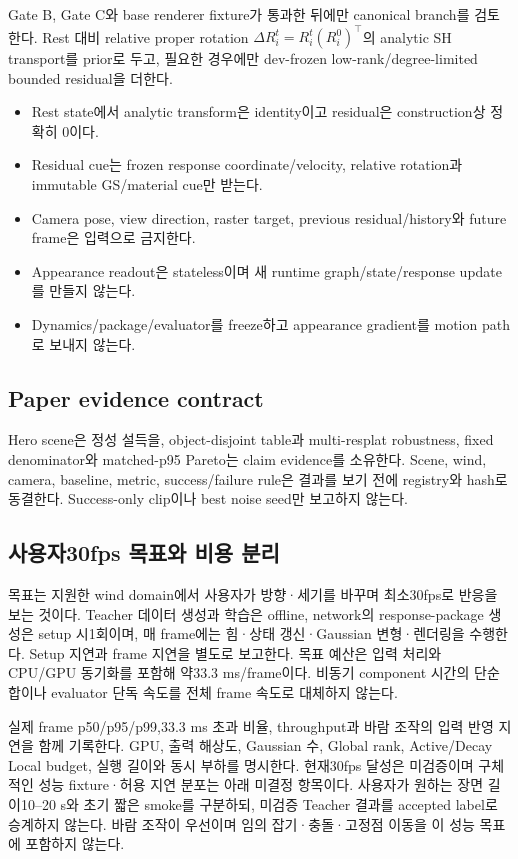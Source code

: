 \documentclass[10pt]{article}
\begin{document}
Gate B, Gate C와 base renderer fixture가 통과한 뒤에만 canonical
 branch를 검토한다. Rest 대비 relative proper rotation
\(\Delta R_i^t=R_i^t(R_i^0)^\top\)의 analytic SH transport를 prior로 두고, 필요한 경우에만
dev-frozen low-rank/degree-limited bounded residual을 더한다.

\begin{itemize}
  \item Rest state에서 analytic transform은 identity이고 residual은 construction상 정확히 0이다.
  \item Residual cue는 frozen response coordinate/velocity, relative rotation과 immutable GS/material cue만 받는다.
  \item Camera pose, view direction, raster target, previous residual/history와 future frame은 입력으로 금지한다.
  \item Appearance readout은 stateless이며 새 runtime graph/state/response update를 만들지 않는다.
  \item Dynamics/package/evaluator를 freeze하고 appearance gradient를 motion path로 보내지 않는다.
\end{itemize}

\subsection{Paper evidence contract}

Hero scene은 정성 설득을, object-disjoint table과 multi-resplat robustness, fixed denominator와 matched-p95
Pareto는 claim evidence를 소유한다. Scene, wind, camera, baseline, metric, success/failure rule은 결과를 보기 전에
registry와 hash로 동결한다. Success-only clip이나 best noise seed만 보고하지 않는다.

\subsection{사용자30fps 목표와 비용 분리}

목표는 지원한 wind domain에서 사용자가 방향·세기를 바꾸며 최소30fps로 반응을 보는 것이다.
Teacher 데이터 생성과 학습은 offline, network의 response-package 생성은 setup 시1회이며,
매 frame에는 힘·상태 갱신·Gaussian 변형·렌더링을 수행한다. Setup 지연과 frame 지연을 별도로 보고한다.
목표 예산은 입력 처리와 CPU/GPU 동기화를 포함해 약33.3 ms/frame이다. 비동기 component 시간의
단순 합이나 evaluator 단독 속도를 전체 frame 속도로 대체하지 않는다.

실제 frame p50/p95/p99,33.3 ms 초과 비율, throughput과 바람 조작의 입력 반영 지연을 함께 기록한다.
GPU, 출력 해상도, Gaussian 수, Global rank, Active/Decay Local budget, 실행 길이와 동시 부하를 명시한다.
현재30fps 달성은 미검증이며 구체적인 성능 fixture·허용 지연 분포는 아래 미결정 항목이다.
사용자가 원하는 장면 길이10--20 s와 초기 짧은 smoke를 구분하되, 미검증 Teacher 결과를 accepted label로 승계하지 않는다.
바람 조작이 우선이며 임의 잡기·충돌·고정점 이동을 이 성능 목표에 포함하지 않는다.
\end{document}
